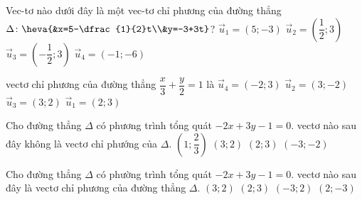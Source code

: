 \begin{ex}%
	Vec-tơ nào dưới đây là một vec-tơ chỉ  phương của đường thẳng $\Delta\colon\heva{&x=5-\dfrac{1}{2}t\\&y=-3+3t}$?
	 \choice
		{$\overrightarrow{u}_1=(5;-3)$} 
		 {$\overrightarrow{u}_2=\left(\dfrac{1}{2};3\right)$}
		{\True  $\overrightarrow{u}_3=\left(-\dfrac{1}{2};3\right)$}
		 {$\overrightarrow{u}_4=(-1;-6)$}
\end{ex}

\begin{ex}%
	 vectơ chỉ phương của đường thẳng $\dfrac{x}{3}+\dfrac{y}{2}=1$ là
	\choice 
		{$\overrightarrow{u}_4=\left(-2;  3\right)$}
		{\True $\overrightarrow{u}_2=\left(3;-2\right)$} 
		{$\overrightarrow{u}_3=\left(3; 2\right)$} 
		 {$\overrightarrow{u}_1=\left(2; 3\right)$}
\end{ex}

\begin{ex}%
	Cho đường thẳng $\Delta$ có phương trình tổng quát $-2x+3y-1=0$. vectơ nào  sau đây không là vectơ chỉ phướng của $\Delta$.
	 \choice
		 {$\left(1; \dfrac{2}{3}\right)$}
		{$(3;  2)$}
		{\True  $(2; 3)$}
		 {$(-3;-2)$}
\end{ex}

\begin{ex}%
	Cho đường thẳng  $\Delta$ có phường trình tổng quát $-2x+3y-1=0$.
	vectơ nào sau đây là vectơ chỉ phương của đường  thẳng $\Delta$.
	 \choice
		{\True $(3; 2)$} 
		 {$(2; 3)$}
		{$(-3; 2)$} 
		 {$(2;-3)$}
\end{ex}

